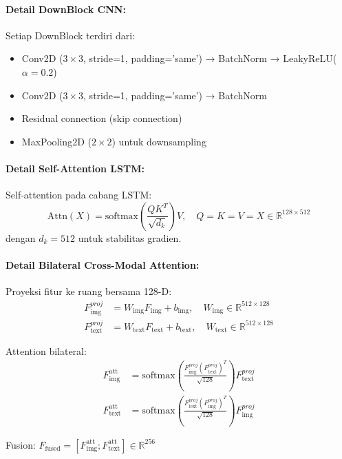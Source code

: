 \paragraph{Detail DownBlock CNN:}
Setiap DownBlock terdiri dari:
\begin{itemize}[nosep]
    \item Conv2D ($3 \times 3$, stride=1, padding='same') → BatchNorm → LeakyReLU($\alpha=0.2$)
    \item Conv2D ($3 \times 3$, stride=1, padding='same') → BatchNorm
    \item Residual connection (skip connection)
    \item MaxPooling2D ($2 \times 2$) untuk downsampling
\end{itemize}

\paragraph{Detail Self-Attention LSTM:}
Self-attention pada cabang LSTM:
\begin{equation}
\text{Attn}(X) = \text{softmax}\left(\frac{Q K^T}{\sqrt{d_k}}\right) V, \quad Q=K=V=X \in \mathbb{R}^{128 \times 512}
\end{equation}
dengan $d_k=512$ untuk stabilitas gradien.

\paragraph{Detail Bilateral Cross-Modal Attention:}
Proyeksi fitur ke ruang bersama 128-D:
\begin{align}
F_{\text{img}}^{proj} &= W_{\text{img}} F_{\text{img}} + b_{\text{img}}, \quad W_{\text{img}} \in \mathbb{R}^{512 \times 128} \\
F_{\text{text}}^{proj} &= W_{\text{text}} F_{\text{text}} + b_{\text{text}}, \quad W_{\text{text}} \in \mathbb{R}^{512 \times 128}
\end{align}

Attention bilateral:
\begin{align}
F_{\text{img}}^{\text{att}} &= \text{softmax}\left(\frac{F_{\text{img}}^{proj} (F_{\text{text}}^{proj})^T}{\sqrt{128}}\right) F_{\text{text}}^{proj} \\
F_{\text{text}}^{\text{att}} &= \text{softmax}\left(\frac{F_{\text{text}}^{proj} (F_{\text{img}}^{proj})^T}{\sqrt{128}}\right) F_{\text{img}}^{proj}
\end{align}

Fusion: $F_{\text{fused}} = [F_{\text{img}}^{\text{att}}; F_{\text{text}}^{\text{att}}] \in \mathbb{R}^{256}$

